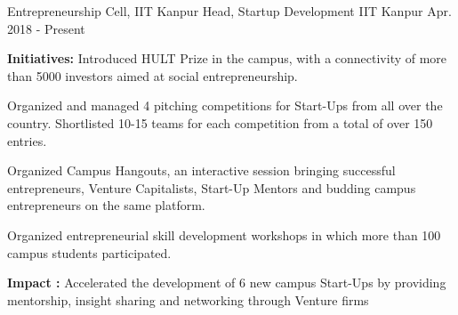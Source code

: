 
\begin{cventries}

  \extraentry
  {Entrepreneurship Cell, IIT Kanpur}
  {Head, Startup Development}
  {IIT Kanpur}
  {Apr. 2018 - Present}
  {
    \begin{cvitems}
    \item {\textbf{Initiatives: }Introduced HULT Prize in the campus, with a connectivity of more than 5000 investors aimed at social entrepreneurship.}
    \item {Organized and managed 4 pitching competitions for Start-Ups from all over the country. Shortlisted 10-15 teams for each competition from a total of over 150 entries.}
    \item {Organized Campus Hangouts, an interactive session bringing successful entrepreneurs, Venture Capitalists, Start-Up Mentors and budding campus entrepreneurs on the same platform.}
    \item {Organized entrepreneurial skill development workshops in which more than 100 campus students participated.}
    \item {\textbf{Impact : }Accelerated the development of 6 new campus Start-Ups by providing mentorship, insight sharing and networking through Venture firms}
    \end{cvitems}
  }



\end{cventries}


